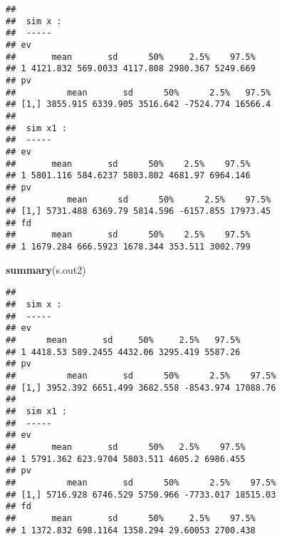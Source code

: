 \documentclass[]{article}
\newenvironment{Shaded}{\begin{snugshade}}{\end{snugshade}}
\newcommand{\KeywordTok}[1]{\textcolor[rgb]{0.13,0.29,0.53}{\textbf{#1}}}
\newcommand{\NormalTok}[1]{#1}
\begin{document}
\begin{verbatim}
## 
##  sim x :
##  -----
## ev
##       mean       sd      50%     2.5%    97.5%
## 1 4121.832 569.0033 4117.808 2980.367 5249.669
## pv
##          mean       sd      50%      2.5%   97.5%
## [1,] 3855.915 6339.905 3516.642 -7524.774 16566.4
## 
##  sim x1 :
##  -----
## ev
##       mean       sd      50%    2.5%    97.5%
## 1 5801.116 584.6237 5803.802 4681.97 6964.146
## pv
##          mean      sd      50%      2.5%    97.5%
## [1,] 5731.488 6369.79 5814.596 -6157.855 17973.45
## fd
##       mean       sd      50%    2.5%    97.5%
## 1 1679.284 666.5923 1678.344 353.511 3002.799
\end{verbatim}

\begin{Shaded}
\begin{Highlighting}[]
\KeywordTok{summary}\NormalTok{(s.out2)}
\end{Highlighting}
\end{Shaded}

\begin{verbatim}
## 
##  sim x :
##  -----
## ev
##      mean       sd     50%     2.5%   97.5%
## 1 4418.53 589.2455 4432.06 3295.419 5587.26
## pv
##          mean       sd      50%      2.5%    97.5%
## [1,] 3952.392 6651.499 3682.558 -8543.974 17088.76
## 
##  sim x1 :
##  -----
## ev
##       mean       sd      50%   2.5%    97.5%
## 1 5791.362 623.9704 5803.511 4605.2 6986.455
## pv
##          mean       sd      50%      2.5%    97.5%
## [1,] 5716.928 6746.529 5750.966 -7733.017 18515.03
## fd
##       mean       sd      50%     2.5%    97.5%
## 1 1372.832 698.1164 1358.294 29.60053 2700.438
\end{verbatim}
\end{document}
